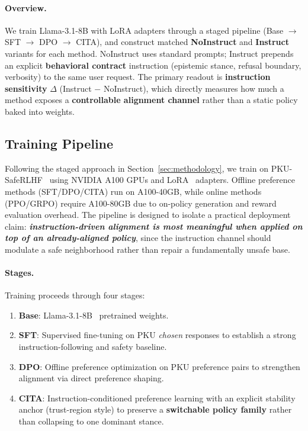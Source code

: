 \vspace{-0.2em}
\paragraph{\textbf{Overview.}}
We train Llama-3.1-8B with LoRA adapters through a staged pipeline (Base $\rightarrow$ SFT $\rightarrow$ DPO $\rightarrow$ \textsc{CITA}), and construct matched \textbf{NoInstruct} and \textbf{Instruct} variants for each method.
NoInstruct uses standard prompts; Instruct prepends an explicit \textbf{behavioral contract} instruction (epistemic stance, refusal boundary, verbosity) to the same user request.
The primary readout is \textbf{instruction sensitivity} $\Delta$ (Instruct $-$ NoInstruct), which directly measures how much a method exposes a \textbf{controllable alignment channel} rather than a static policy baked into weights.

\vspace{-1mm}
\subsection{Training Pipeline}
\label{sec:training_pipeline_exp}

Following the staged approach in Section~\ref{sec:methodology}, we train on PKU-SafeRLHF~\cite{ji2024pku,bai2022training} using NVIDIA A100 GPUs and LoRA~\cite{hu2022lora} adapters.
Offline preference methods (SFT/DPO/\textsc{CITA}) run on A100-40GB, while online methods (PPO/GRPO) require A100-80GB due to on-policy generation and reward evaluation overhead.
The pipeline is designed to isolate a practical deployment claim:
\textbf{\emph{instruction-driven alignment is most meaningful when applied on top of an already-aligned policy}}, since the instruction channel should modulate a safe neighborhood rather than repair a fundamentally unsafe base.

\vspace{-0.2em}
\paragraph{\textbf{Stages.}}
Training proceeds through four stages:

\begin{enumerate}[leftmargin=*,itemsep=1pt]
    \item \textbf{Base}: Llama-3.1-8B~\cite{dubey2024llama} pretrained weights.
    \item \textbf{SFT}: Supervised fine-tuning on PKU \emph{chosen} responses to establish a strong instruction-following and safety baseline.
    \item \textbf{DPO}: Offline preference optimization on PKU preference pairs to strengthen alignment via direct preference shaping.
    \item \textbf{\textsc{CITA}}: Instruction-conditioned preference learning with an explicit stability anchor (trust-region style) to preserve a \textbf{switchable policy family} rather than collapsing to one dominant stance.
\end{enumerate}


